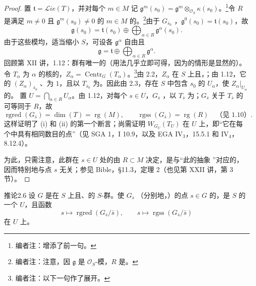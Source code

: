 \begin{proof}
置 $\mathfrak t=\mathscr{L}\!ie(T)$，并对每个 $m\in M$ 记 $\mathfrak g^m(s_0)=\mathfrak g^m\otimes_{\mathscr O_S}\kappa(s_0)$。\footnote[23]{编者注：增添了前一句。}令 $R$ 是满足 $m\ne0$ 且 $\mathfrak g^m(s_0)\ne0$ 的 $m\in M$ 的。\footnote[24]{编者注：注意，因 $\mathfrak g$ 是 $\mathscr O_S$-模，$R$ 是。}由于 $G_{\bar s_0}$ ，$\mathfrak g^0(s_0)=\mathfrak t(s_0)$，故
\[
\mathfrak g(s_0)=\mathfrak t(s_0)\oplus\bigoplus_{\alpha\in R}\mathfrak g^\alpha(s_0).
\]
由于这些模均，适当缩小 $S$，可设各 $\mathfrak g^\alpha$ 自由且
\[
\mathfrak g=\mathfrak t\oplus\bigoplus_{\alpha\in R}\mathfrak g^\alpha.
\]
回顾第 XII 讲，1.12：群有唯一的（用法几乎立即可得，因为的情形是显然的）。令 $T_\alpha$ 为 $\alpha$ 的核的，$Z_\alpha=\operatorname{Centr}_G(T_\alpha)$。\footnote[25]{编者注：以下一句作了展开。}由 2.2，$Z_\alpha$ 在 $S$ 上且，；由 1.12，它的 $(Z_\alpha)_{\bar s_0}$ 、为 $1$，且以 $T_{\bar s_0}$ 为。因此由 2.3，存在 $S$ 中包含 $s_0$ 的 $U_\alpha$，使 $Z_\alpha|_{U_\alpha}$ 的。
置 $U=\bigcap_{\alpha\in R}U_\alpha$。由 1.12，对每个 $s\in U$，$G_{\bar s}$ ，以 $T_{\bar s}$ 为；$G_{\bar s}$ 关于 $T_{\bar s}$ 的可等同于 $R$，故
\[
\operatorname{rgred}(G_{\bar s})=\dim(T)=\operatorname{rg}(M),\qquad
\operatorname{rgss}(G_{\bar s})=\operatorname{rg}(R)\quad\text{（见 1.10）}.
\]
这样证明了 (i) 和 (ii) 的第一个断言；尚需证明  $W_{G_U}(T_U)$ 在 $U$ 上，即“它在每个中具有相同数目的点”（见 SGA 1，I 10.9，以及 EGA IV$_3$，15.5.1 和 IV$_4$，8.12.4）。

为此，只需注意，此群在 $s\in U$ 处的由 $R\subset M$ 决定，是与“此的抽象 ”对应的，因而特别地与点 $s$ 无关；参见 Bible，\S 11.3，定理 2（也见第 XXII 讲，第 3 节）。
\end{proof}
\begin{SGAresult}{推论}{2.6}
设 $G$ 是在 $S$ 上且、的 $S$-群。使 $G_{\bar s}$ （分别地，）的点 $s\in G$ 的，是 $S$ 的一个 $U$，且函数
\[
s\longmapsto\operatorname{rgred}(G_{\bar s}/\bar s),\qquad
s\longmapsto\operatorname{rgss}(G_{\bar s}/\bar s)
\]
在 $U$ 上。
\end{SGAresult}
